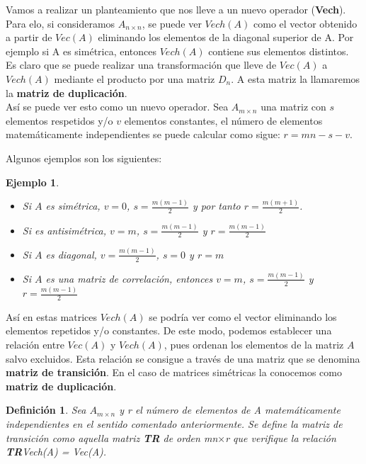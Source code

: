 \documentclass{article}
\theoremstyle{theorem-style}  %
\theoremstyle{definition-style}
\newtheorem{definition}{Definición}[section]
\theoremstyle{example-style}
\newtheorem{example}{Ejemplo}[section]
\theoremstyle{exercise-style}
\begin{document}
	Vamos a realizar un planteamiento que nos lleve a un nuevo operador (\textbf{Vech}). Para elo, si consideramos $A_{n \times n}$, se puede ver $Vech(A)$ como el vector obtenido a partir de $Vec(A)$ eliminando los elementos de la diagonal superior de A. Por ejemplo si A es simétrica, entonces $Vech(A)$ contiene sus elementos distintos. \\
	
	Es claro que se puede realizar una transformación que lleve de $Vec(A)$ a $Vech(A)$ mediante el producto por una matriz $D_n$. A esta matriz la llamaremos la \textbf{matriz de duplicación}. \\
	
	Así se puede ver esto como un nuevo operador. Sea $A_{m \times n}$ una matriz con $s$ elementos respetidos y/o $v$ elementos constantes, el número de elementos matemáticamente independientes se puede calcular como sigue: $r=mn-s-v$.  
	
	Algunos ejemplos son los siguientes:
	
	\begin{example}	
		\begin{itemize}
			\item Si $A$ es simétrica, $v=0$, $s=\frac{m(m-1)}{2}$ y  por tanto $r=\frac{m(m+1)}{2}$.
			
			\item Si es antisimétrica, $v=m$, $s=\frac{m(m-1)}{2}$ y $r= \frac{m(m-1)}{2}$
			
			\item Si $A$ es diagonal, $v=\frac{m(m-1)}{2}$, $s=0$ y $r= m$ 
			
			\item Si $A$ es una matriz de correlación, entonces $v=m$, $s=\frac{m(m-1)}{2}$ y $r= \frac{m(m-1)}{2}$
		\end{itemize}
	\end{example}
	
	Así en estas matrices $Vech(A)$ se podría ver como el vector eliminando los elementos repetidos y/o constantes. De este modo, podemos establecer una relación entre $Vec(A)$ y $Vech(A)$, pues ordenan los elementos de la matriz $A$ salvo excluidos. Esta relación se consigue a través de una matriz que se denomina \textbf{matriz de transición}. En el caso de matrices simétricas la conocemos como \textbf{matriz de duplicación}.
	
	\begin{definition}
		Sea $A_{m\times n}$ y r el número de elementos de A matemáticamente independientes en el sentido comentado anteriormente. Se define la matriz de transición como aquella matriz \textbf{TR} de orden mn$\times$r que verifique la relación \textbf{TR}Vech(A) = Vec(A).
	\end{definition}
	
\end{document}
